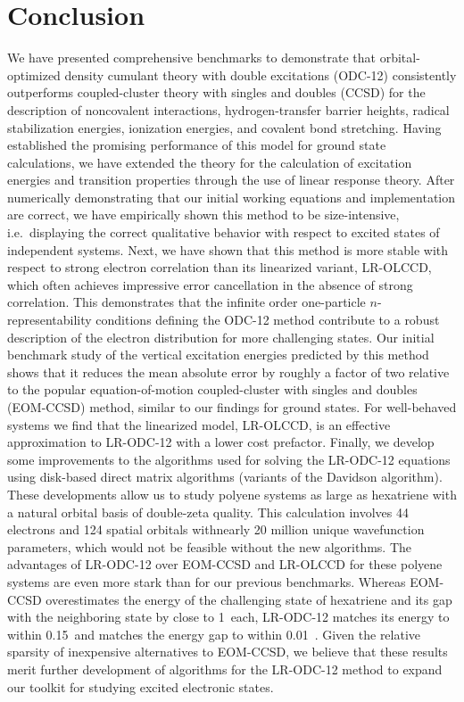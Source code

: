 \chapter{Conclusion}
\label{ch:conclusion}

We have presented comprehensive benchmarks to demonstrate that orbital-optimized
density cumulant theory with double excitations (ODC-12) consistently
outperforms coupled-cluster theory with singles and doubles (CCSD) for
the description of noncovalent interactions, hydrogen-transfer barrier
heights, radical stabilization energies, ionization energies, and covalent bond
stretching.
Having established the promising performance of this model for ground state
calculations, we have extended the theory for the calculation of excitation
energies and transition properties through the use of linear response theory.
After numerically demonstrating that our initial working equations and
implementation are correct, we have empirically shown this method to be
size-intensive, i.e.\ displaying the correct qualitative behavior with respect
to excited states of independent systems.
Next, we have shown that this method is more stable with respect to strong
electron correlation than its linearized variant, LR-OLCCD, which often achieves
impressive error cancellation in the absence of strong correlation.
This demonstrates that the infinite order one-particle \(n\)-representability
conditions defining the ODC-12 method contribute to a robust description of the
electron distribution for more challenging states.
Our initial benchmark study of the vertical excitation energies predicted by
this method shows that it reduces the mean absolute error by roughly a factor of
two relative to the popular equation-of-motion coupled-cluster with singles and
doubles (EOM-CCSD) method, similar to our findings for ground states.
For well-behaved systems we find that the linearized model, LR-OLCCD, is an
effective approximation to LR-ODC-12 with a lower cost prefactor.
Finally, we develop some improvements to the algorithms used for solving the
LR-ODC-12 equations using disk-based direct matrix algorithms (variants of the
Davidson algorithm).
These developments allow us to study polyene systems as large as hexatriene with
a natural orbital basis of double-zeta quality.
This calculation involves 44 electrons and 124 spatial orbitals withnearly 20
million unique wavefunction parameters, which would not be feasible without the
new algorithms.
The advantages of LR-ODC-12 over EOM-CCSD and LR-OLCCD for these polyene systems
are even more stark than for our previous benchmarks.
Whereas EOM-CCSD overestimates the energy of the challenging
 state of hexatriene and its gap with the neighboring
 state by close to 1~\eV each, LR-ODC-12 matches its energy
to within 0.15~\eV and matches the energy gap to within 0.01~\eV.
Given the relative sparsity of inexpensive alternatives to EOM-CCSD, we believe
that these results merit further development of algorithms for the LR-ODC-12
method to expand our toolkit for studying excited electronic states.

